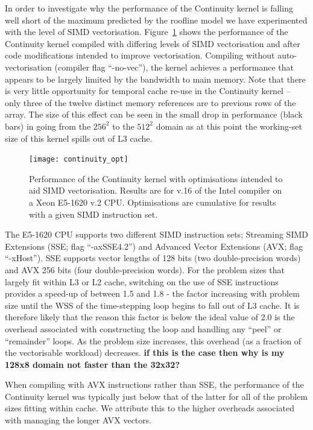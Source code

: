 \documentclass[12pt]{article}
\begin{document}
In order to investigate why the performance of the Continuity kernel
is falling well short of the maximum predicted by the roofline model
we have experimented with the level of SIMD
vectorisation. Figure~\ref{FIG_cont_vec} shows the performance of the
Continuity kernel compiled with differing levels of SIMD vectorisation
and after code modifications intended to improve vectorisation.
Compiling without auto-vectorisation (compiler flag ``-no-vec''), the
kernel achieves a performance that appears to be largely limited by
the bandwidth to main memory. Note that there is very little
opportunity for temporal cache re-use in the Continuity kernel -- only
three of the twelve distinct memory references are to previous rows of
the array. The size of this effect can be seen in the small drop in
performance (black bars) in going from the $256^2$ to the $512^2$
domain as at this point the working-set size of this kernel spills out
of L3 cache.

\begin{figure}
  \centering
  \texttt{[image: continuity\_opt]}
  \caption{Performance of the Continuity kernel with optimisations
    intended to aid SIMD vectorisation. Results are for v.16 of the
    Intel compiler on a Xeon E5-1620 v.2 CPU. Optimisations are
    cumulative for results with a given SIMD instruction set.}
  \label{FIG_cont_vec}
\end{figure}

The E5-1620 CPU supports two different SIMD instruction sets;
Streaming SIMD Extensions (SSE; flag ``-axSSE4.2'') and Advanced
Vector Extensions (AVX; flag ``-xHost''). SSE supports vector lengths
of 128 bits (two double-precision words) and AVX 256 bits (four
double-precision words). For the problem sizes that largely fit within
L3 or L2 cache, switching on the use of SSE instructions provides a
speed-up of between 1.5 and 1.8 - the factor increasing with problem
size until the WSS of the time-stepping loop begins to fall out of L3
cache. It is therefore likely that the reason this factor is below the
ideal value of 2.0 is the overhead associated with constructing the
loop and handling any ``peel'' or ``remainder'' loops. As the problem
size increases, this overhead (as a fraction of the vectorisable
workload) decreases. {\bf if this is the case then why is my 128x8 domain
not faster than the 32x32?}

When compiling with AVX instructions rather than SSE, the performance
of the Continuity kernel was typically just below that of the latter
for all of the problem sizes fitting within cache. We attribute this
to the higher overheads associated with managing the longer AVX
vectors.
\end{document}
